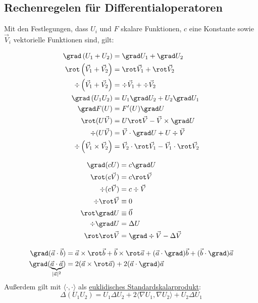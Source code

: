 	  \subsection{Rechenregelen für Differentialoperatoren}
	  Mit den Festlegungen, dass $U_i$ und $F$ skalare Funktionen, $c$ eine Konstante sowie $\vec{V}_i$ vektorielle Funktionen sind, gilt:\\
	  \begin{minipage}{.57\textwidth}
	  	\begin{align}
	  		\grad\left(U_1+U_2\right)&=\grad U_1+\grad U_2 \\
	  		  \rot\left(\vec{ {V}}_1+\vec{ {V}}_2\right)&=\rot \vec{ {V}}_1+\rot \vec{ {V}}_2\\
	  		  \div\left(\vec{ {V}}_1+\vec{ {V}}_2\right)&=\div \vec{ {V}}_1+\div \vec{ {V}}_2 \\
	  		\grad\left(U_1 U_2\right)&=U_1 \grad U_2+U_2 \grad U_1 \\
	  		\grad F(U)&=F^{\prime}(U) \grad U \\
			\rot(U \vec{ {V}})&=U \rot \vec{ {V}}-\vec{ {V}} \times \grad U \label{rotuv} \\
	  		\div(U \vec{ {V}})&=\vec{ {V}} \cdot \grad U+U \div \vec{ {V}} \label{divsV} \\
	  		\div\left(\vec{ {V}}_1 \times \vec{ {V}}_2\right)&=\vec{ {V}}_2 \cdot \rot \vec{ {V}}_1-\vec{ {V}}_1 \cdot \rot \vec{ {V}}_2 \label{divcross}
	  		\end{align}
	  \end{minipage}
	  	  \begin{minipage}{.43\textwidth}
	  \begin{align}
	  	\grad(c U)&=c \grad U\\
	   \rot(c \vec{ {V}})&=c \rot \vec{ {V}} \\
	   \div(c \vec{ {V}})&=c \div \vec{ {V}}\\
	   \div \rot \vec{ {V}} &\equiv 0 \label{divrot}\\ 
	   \rot \grad U &\equiv \vec{ {0}} \\
	   \div \grad U&=\Delta U \\ 
	   \rot \rot \vec{ {V}}&=\grad \div \vec{ {V}}-\Delta \vec{ {V}} \label{rotrot}	   
	  \end{align}
	  	  \end{minipage}
	  	  \begin{align}\label{gradab}
	  	  \grad (\vec{a}\cdot\vec{b}) &= \vec{a}\times\rot \vec{b} + \vec{b}\times\rot \vec{a} + (\vec{a}\cdot\grad )\vec{b} + (\vec{b}\cdot\grad )\vec{a}\\
	  	  \grad (\underbrace{\vec{a}\cdot\vec{a}}_{|\vec{a}|^2}) &= 2 (\vec{a}\times\rot \vec{a}) + 2 (\vec{a}\cdot\grad )\vec{a}
	  	  \end{align}
	  	  Außerdem gilt mit $\langle\cdot,\cdot\rangle$ als \href{https://de.wikipedia.org/wiki/Standardskalarprodukt}{euklidisches Standardskalarprodukt}:
	  	  \begin{equation}\label{ProdLapl}
	  	  	\Delta (U_1U_2) = U_1 \Delta U_2 + 2 \langle \nabla U_1 , \nabla U_2\rangle + U_2 \Delta U_1
	  	  \end{equation}
